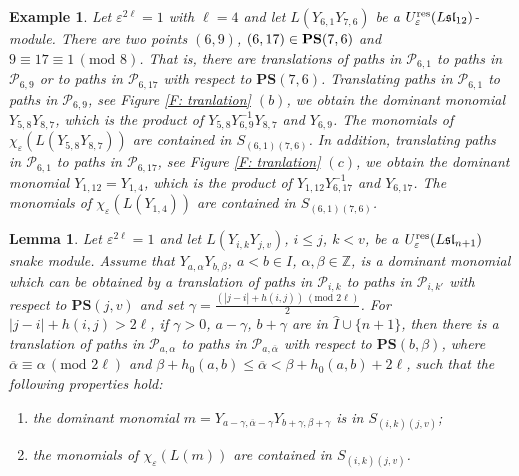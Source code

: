 \documentclass[12pt, reqno]{amsart}
\newtheorem{lemma}[theorem]{Lemma}
\newtheorem{example}[theorem]{Example}
\numberwithin{equation}{section}
\newcommand{\res}{{\rm res}}
\begin{document}
{\begin{example} \label{example:type ii translation of paths}
Let $\varepsilon^{2 \ell}=1$ with $\ell=4$ and let $L(Y_{6,1}Y_{7,6})$ be a $U_{\varepsilon}^{\res}({L\mathfrak{sl}_{12}})$-module. There are two points $(6,9)$, $(6,17) \in {\bf PS}(7,6)$ and $9\equiv 17\equiv 1 \, (\text{mod } 8)$. That is, there are translations of paths in $\mathscr{P}_{6,1}$ to paths in $\mathscr{P}_{6,9}$ or to paths in $\mathscr{P}_{6,17}$ with respect to $\mathbf{PS}(7,6)$. Translating paths in $\mathscr{P}_{6,1}$ to paths in $\mathscr{P}_{6,9}$, see Figure \ref{F: tranlation} $(b)$, we obtain the dominant monomial $Y_{5,8}Y_{8,7}$, which is the product of $Y_{5,8}Y_{6,9}^{-1}Y_{8,7}$ and $Y_{6,9}$. The monomials of $\chi_\varepsilon(L(Y_{5,8}Y_{8,7}))$ are contained in $S_{(6,1)(7,6)}$. In addition, translating paths in $\mathscr{P}_{6,1}$ to paths in $\mathscr{P}_{6,17}$, see Figure \ref{F: tranlation} $(c)$, we obtain the dominant monomial $Y_{1,12}=Y_{1,4}$, which is the product of $Y_{1,12}Y_{6,17}^{-1}$ and $Y_{6,17}$. The monomials of $\chi_\varepsilon(L(Y_{1,4}))$ are contained in $S_{(6,1)(7,6)}$.
\end{example}






\begin{lemma}\label{Le: two translations}
Let $\varepsilon^{2 \ell}=1$ and let $L(Y_{i,k}Y_{j,v})$, $i\leq j$, $k<v$, be a $U_{\varepsilon}^{\res}({L\mathfrak{sl}_{n+1}})$ snake module. Assume that $Y_{a,\alpha}Y_{b,\beta}$, $a< b \in I$, $\alpha, \beta \in \mathbb{Z}$, is a dominant monomial which can be obtained by a translation of paths in $\mathscr{P}_{i,k}$ to paths in $\mathscr{P}_{i,k'}$ with respect to $\mathbf{PS}(j,v)$ and set $\gamma=\frac{(|j-i|+h(i,j))\,(\text{mod } 2 \ell)}2$. For $|j-i|+h(i,j)>2 \ell$, if $\gamma>0$, $a-\gamma$, $b+\gamma$ are in $\hat{I}\cup\{n+1\}$, then there is a translation of paths in $\mathscr{P}_{a,\alpha}$ to paths in $\mathscr{P}_{a, \overline{\alpha}}$ with respect to $\mathbf{PS}(b,\beta)$, where $\overline{\alpha}\equiv \alpha \, (\text{mod } 2 \ell)$ and $\beta+h_0(a,b)\leq \overline{\alpha}< \beta+h_0(a,b)+2 \ell$, such that the following properties hold:
\begin{enumerate}
    \item the dominant monomial $m=Y_{a-\gamma,\overline{\alpha}-\gamma}Y_{b+\gamma,\beta+\gamma}$ is in $S_{(i,k)(j,v)}$;
    \item the monomials of $\chi_\varepsilon(L(m))$ are contained in $S_{(i,k)(j,v)}$.
\end{enumerate}
\end{lemma}

}
\end{document}
